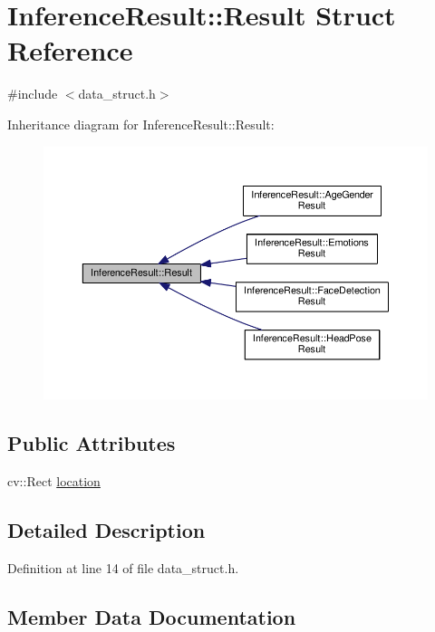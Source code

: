 \hypertarget{structInferenceResult_1_1Result}{}\section{Inference\+Result\+:\+:Result Struct Reference}
\label{structInferenceResult_1_1Result}


{\ttfamily \#include $<$data\+\_\+struct.\+h$>$}



Inheritance diagram for Inference\+Result\+:\+:Result\+:
\nopagebreak
\begin{figure}[H]
\begin{center}
\leavevmode
\includegraphics[width=350pt]{structInferenceResult_1_1Result__inherit__graph}
\end{center}
\end{figure}
\subsection*{Public Attributes}
\begin{DoxyCompactItemize}
\item 
cv\+::\+Rect \hyperlink{structInferenceResult_1_1Result_a20260cebf785b75132140ab517594660}{location}
\end{DoxyCompactItemize}


\subsection{Detailed Description}


Definition at line 14 of file data\+\_\+struct.\+h.



\subsection{Member Data Documentation}
